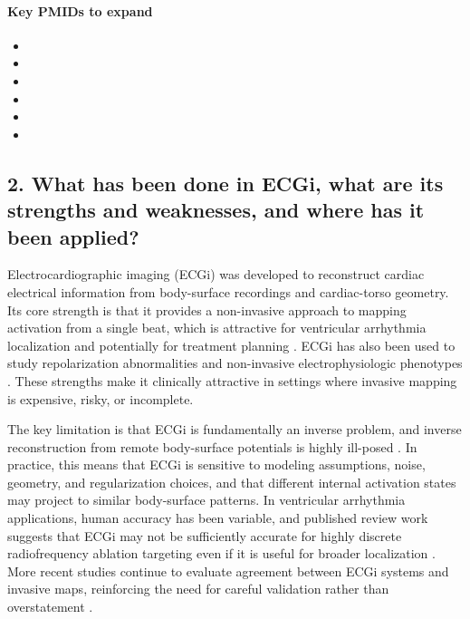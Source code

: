 \paragraph{Key PMIDs to expand}
\begin{itemize}
    \item {}
    \item {}
    \item {}
    \item {}
    \item {}
    \item {}
\end{itemize}

\subsection*{2. What has been done in ECGi, what are its strengths and weaknesses, and where has it been applied?}

Electrocardiographic imaging (ECGi) was developed to reconstruct cardiac electrical information from body-surface recordings and cardiac-torso geometry. Its core strength is that it provides a non-invasive approach to mapping activation from a single beat, which is attractive for ventricular arrhythmia localization and potentially for treatment planning \cite{pmid34777827}. ECGi has also been used to study repolarization abnormalities and non-invasive electrophysiologic phenotypes \cite{pmid33880931}. These strengths make it clinically attractive in settings where invasive mapping is expensive, risky, or incomplete.

The key limitation is that ECGi is fundamentally an inverse problem, and inverse reconstruction from remote body-surface potentials is highly ill-posed \cite{pmid15649241}. In practice, this means that ECGi is sensitive to modeling assumptions, noise, geometry, and regularization choices, and that different internal activation states may project to similar body-surface patterns. In ventricular arrhythmia applications, human accuracy has been variable, and published review work suggests that ECGi may not be sufficiently accurate for highly discrete radiofrequency ablation targeting even if it is useful for broader localization \cite{pmid34777827}. More recent studies continue to evaluate agreement between ECGi systems and invasive maps, reinforcing the need for careful validation rather than overstatement \cite{pmid37390586}.


